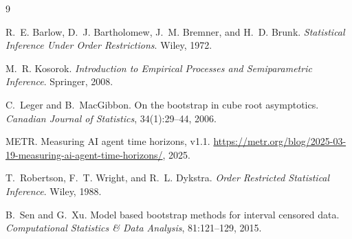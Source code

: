 \documentclass[11pt,a4paper]{article}
\begin{document}

\begin{thebibliography}{9}

R.~E. Barlow, D.~J. Bartholomew, J.~M. Bremner, and H.~D. Brunk.
\newblock \emph{Statistical Inference Under Order Restrictions}.
\newblock Wiley, 1972.

M.~R. Kosorok.
\newblock \emph{Introduction to Empirical Processes and Semiparametric Inference}.
\newblock Springer, 2008.

C.~Leger and B.~MacGibbon.
\newblock On the bootstrap in cube root asymptotics.
\newblock \emph{Canadian Journal of Statistics}, 34(1):29--44, 2006.

METR.
\newblock Measuring AI agent time horizons, v1.1.
\newblock \url{https://metr.org/blog/2025-03-19-measuring-ai-agent-time-horizons/}, 2025.

T.~Robertson, F.~T. Wright, and R.~L. Dykstra.
\newblock \emph{Order Restricted Statistical Inference}.
\newblock Wiley, 1988.

B.~Sen and G.~Xu.
\newblock Model based bootstrap methods for interval censored data.
\newblock \emph{Computational Statistics \& Data Analysis}, 81:121--129, 2015.

\end{thebibliography}
\end{document}
